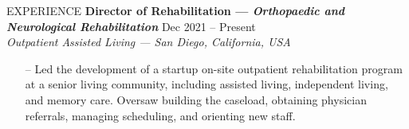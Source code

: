 \documentclass{resume} %
\begin{document}
\begin{rSection}{EXPERIENCE}
\textbf{Director of Rehabilitation --- \textit{Orthopaedic and Neurological Rehabilitation}} \hfill Dec 2021 -- Present\\
\textit{Outpatient Assisted Living --- San Diego, California, USA}
\vspace*{-0.2cm}\begin{itemize}
    \item[--] Led the development of a startup on-site outpatient rehabilitation program at a senior living community, including assisted living, independent living, and memory care. Oversaw building the caseload, obtaining physician referrals, managing scheduling, and orienting new staff.
\end{itemize}


\end{rSection}
\end{document}
